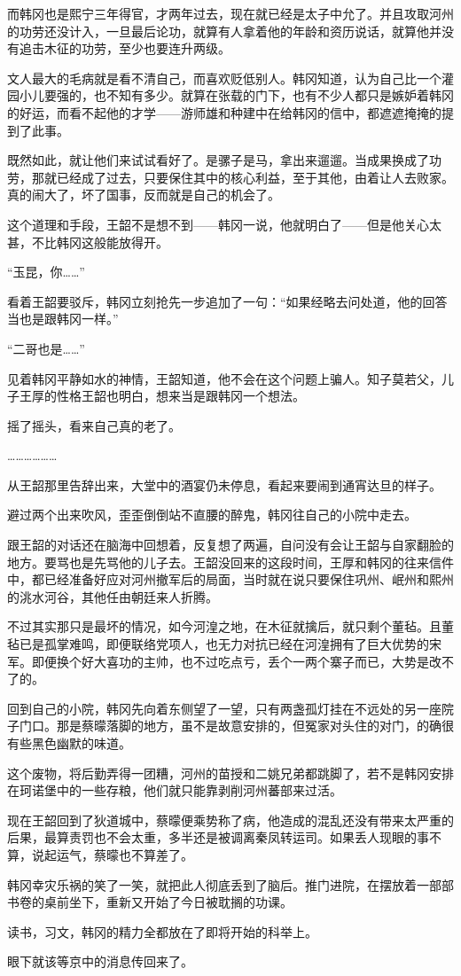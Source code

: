 而韩冈也是熙宁三年得官，才两年过去，现在就已经是太子中允了。并且攻取河州的功劳还没计入，一旦最后论功，就算有人拿着他的年龄和资历说话，就算他并没有追击木征的功劳，至少也要连升两级。

文人最大的毛病就是看不清自己，而喜欢贬低别人。韩冈知道，认为自己比一个灌园小儿要强的，也不知有多少。就算在张载的门下，也有不少人都只是嫉妒着韩冈的好运，而看不起他的才学——游师雄和种建中在给韩冈的信中，都遮遮掩掩的提到了此事。

既然如此，就让他们来试试看好了。是骡子是马，拿出来遛遛。当成果换成了功劳，那就已经成了过去，只要保住其中的核心利益，至于其他，由着让人去败家。真的闹大了，坏了国事，反而就是自己的机会了。

这个道理和手段，王韶不是想不到——韩冈一说，他就明白了——但是他关心太甚，不比韩冈这般能放得开。

“玉昆，你……”

看着王韶要驳斥，韩冈立刻抢先一步追加了一句：“如果经略去问处道，他的回答当也是跟韩冈一样。”

“二哥也是……”

见着韩冈平静如水的神情，王韶知道，他不会在这个问题上骗人。知子莫若父，儿子王厚的性格王韶也明白，想来当是跟韩冈一个想法。

摇了摇头，看来自己真的老了。

………………

从王韶那里告辞出来，大堂中的酒宴仍未停息，看起来要闹到通宵达旦的样子。

避过两个出来吹风，歪歪倒倒站不直腰的醉鬼，韩冈往自己的小院中走去。

跟王韶的对话还在脑海中回想着，反复想了两遍，自问没有会让王韶与自家翻脸的地方。要骂也是先骂他的儿子去。王韶没回来的这段时间，王厚和韩冈的往来信件中，都已经准备好应对河州撤军后的局面，当时就在说只要保住巩州、岷州和熙州的洮水河谷，其他任由朝廷来人折腾。

不过其实那只是最坏的情况，如今河湟之地，在木征就擒后，就只剩个董毡。且董毡已是孤掌难鸣，即便联络党项人，也无力对抗已经在河湟拥有了巨大优势的宋军。即便换个好大喜功的主帅，也不过吃点亏，丢个一两个寨子而已，大势是改不了的。

回到自己的小院，韩冈先向着东侧望了一望，只有两盏孤灯挂在不远处的另一座院子门口。那是蔡曚落脚的地方，虽不是故意安排的，但冤家对头住的对门，的确很有些黑色幽默的味道。

这个废物，将后勤弄得一团糟，河州的苗授和二姚兄弟都跳脚了，若不是韩冈安排在珂诺堡中的一些存粮，他们就只能靠剥削河州蕃部来过活。

现在王韶回到了狄道城中，蔡曚便乘势称了病，他造成的混乱还没有带来太严重的后果，最算责罚也不会太重，多半还是被调离秦凤转运司。如果丢人现眼的事不算，说起运气，蔡曚也不算差了。

韩冈幸灾乐祸的笑了一笑，就把此人彻底丢到了脑后。推门进院，在摆放着一部部书卷的桌前坐下，重新又开始了今日被耽搁的功课。

读书，习文，韩冈的精力全都放在了即将开始的科举上。

眼下就该等京中的消息传回来了。

